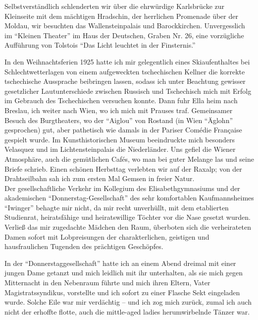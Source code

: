 Selbstverständlich schlenderten wir über die ehrwürdige Karlsbrücke zur Kleinseite mit dem mächtigen Hradschin, der herrlichen Promenade über der Moldau, wir besuchten das Wallensteinpalais und Barockkirchen. Unvergesslich im \enquote{Kleinen Theater} im Haus der Deutschen, Graben Nr. 26, eine vorzügliche Aufführung von Tolstois \enquote{Das Licht leuchtet in der Finsternis.}

In den Weihnachtsferien 1925 hatte ich mir gelegentlich eines Skiaufenthaltes bei Schlechtwetterlagen von einem aufgeweckten tschechischen Kellner die korrekte tschechische Aussprache beibringen lassen, sodass ich unter Beachtung gewisser gesetzlicher Lautunterschiede zwischen Russisch und Tschechisch mich mit Erfolg im Gebrauch des Tschechischen versuchen konnte. Dann fuhr Ella heim nach Breslau, ich weiter nach Wien, wo ich mich mit Prauses traf. Gemeinsamer Besuch des Burgtheaters, wo der \enquote{Aiglou} von Rostand (in Wien \enquote{Äglohn} gesprochen) gut, aber pathetisch wie damals in der Pariser Comédie Française gespielt wurde. Im Kunsthistorischen Museum beeindruckte mich besonders Velasquez und im Lichtensteinpalais die Niederländer. Uns gefiel die Wiener Atmosphäre, auch die gemütlichen Cafés, wo man bei guter Melange las und seine Briefe schrieb. Einen schönen Herbsttag verlebten wir auf der Raxalp; von der Drahtseilbahn sah ich zum ersten Mal Gemsen in freier Natur.\\

Der gesellschaftliche Verkehr im Kollegium des Elisabethgymnasiums und der akademischen \enquote{Donnerstag-Gesellschaft} des sehr komfortablen Kaufmannsheimes \enquote{Iwinger} behagte mir nicht, da mir recht unverhüllt, mit dem etablierten Studienrat, heiratsfähige und heiratswillige Töchter vor die Nase gesetzt wurden. Verließ das mir zugedachte Mädchen den Raum, überboten sich die verheirateten Damen sofort mit Lobpreisungen der charakterlichen, geistigen und hausfraulichen Tugenden des prächtigen Geschöpfes.

In der \enquote{Donnerstaggesellschaft} hatte ich an einem Abend dreimal mit einer jungen Dame getanzt und mich leidlich mit ihr unterhalten, als sie mich gegen Mitternacht in den Nebenraum führte und mich ihren Eltern, Vater Magistratssyndikus, vorstellte und ich sofort zu einer Flasche Sekt eingeladen wurde. Solche Eile war mir verdächtig -- und ich zog mich zurück, zumal ich auch nicht der erhoffte flotte, auch die mittle-aged ladies herumwirbelnde Tänzer war.

